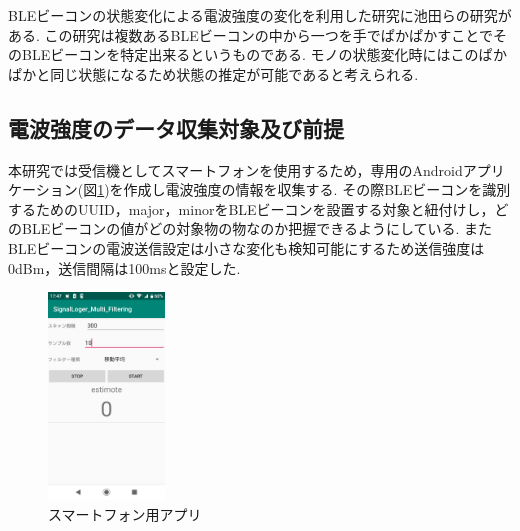 \documentclass[Japanese]{dicomopapers}
\begin{document}
BLEビーコンの状態変化による電波強度の変化を利用した研究に池田ら\cite{BLEpkpk}の研究がある.
この研究は複数あるBLEビーコンの中から一つを手でぱかぱかすことでそのBLEビーコンを特定出来るというものである.
モノの状態変化時にはこのぱかぱかと同じ状態になるため状態の推定が可能であると考えられる.





\subsection{電波強度のデータ収集対象及び前提}

本研究では受信機としてスマートフォンを使用するため，専用のAndroidアプリケーション(図\ref{phoneApp})を作成し電波強度の情報を収集する.
その際BLEビーコンを識別するためのUUID，major，minorをBLEビーコンを設置する対象と紐付けし，どのBLEビーコンの値がどの対象物の物なのか把握できるようにしている.
またBLEビーコンの電波送信設定は小さな変化も検知可能にするため送信強度は0dBm，送信間隔は100msと設定した.

\begin{figure}[ht]
    \centering
    \includegraphics[height=5.5cm]{application.jpg}
    \caption{スマートフォン用アプリ}
    \label{phoneApp}
\end{figure}




\end{document}
